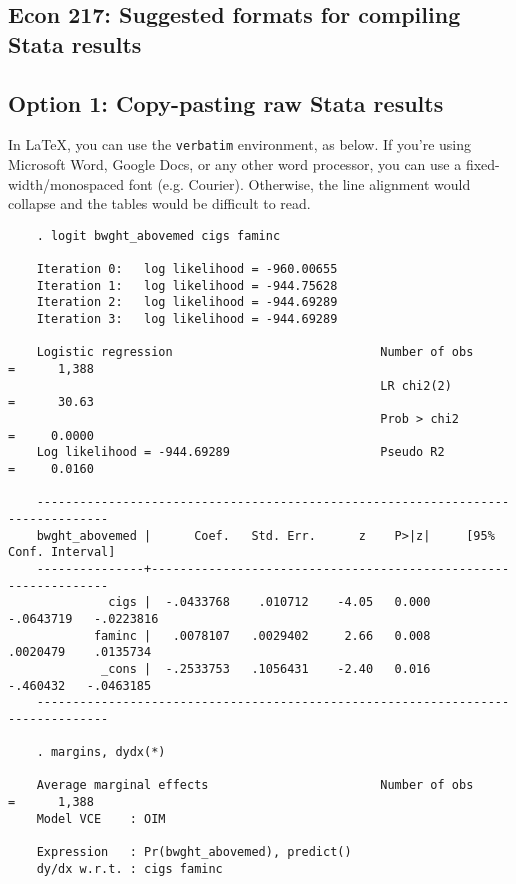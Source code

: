 \documentclass[letterpaper]{article}
\begin{document}
\begin{spacing}{1.2}

\section*{Econ 217: Suggested formats for compiling Stata results}



\subsection*{Option 1: Copy-pasting raw Stata results}

In LaTeX, you can use the \texttt{verbatim} environment, as below. If you’re using Microsoft Word, Google Docs, or any other word processor, you can use a fixed-width/monospaced font (e.g. Courier). Otherwise, the line alignment would collapse and the tables would be difficult to read. 

	\begin{verbatim}
	. logit bwght_abovemed cigs faminc       

	Iteration 0:   log likelihood = -960.00655  
	Iteration 1:   log likelihood = -944.75628  
	Iteration 2:   log likelihood = -944.69289  
	Iteration 3:   log likelihood = -944.69289  

	Logistic regression                             Number of obs     =      1,388
	                                                LR chi2(2)        =      30.63
	                                                Prob > chi2       =     0.0000
	Log likelihood = -944.69289                     Pseudo R2         =     0.0160

	--------------------------------------------------------------------------------
	bwght_abovemed |      Coef.   Std. Err.      z    P>|z|     [95% Conf. Interval]
	---------------+----------------------------------------------------------------
	          cigs |  -.0433768    .010712    -4.05   0.000    -.0643719   -.0223816
	        faminc |   .0078107   .0029402     2.66   0.008     .0020479    .0135734
	         _cons |  -.2533753   .1056431    -2.40   0.016     -.460432   -.0463185
	--------------------------------------------------------------------------------

	. margins, dydx(*)                                       

	Average marginal effects                        Number of obs     =      1,388
	Model VCE    : OIM

	Expression   : Pr(bwght_abovemed), predict()
	dy/dx w.r.t. : cigs faminc


\end{verbatim}
\end{spacing}
\end{document}
